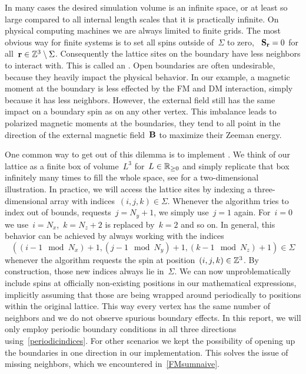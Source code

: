 In many cases the desired simulation volume is an infinite space, or at least so
large compared to all internal length scales that it is practically infinite. On
physical computing machines we are always limited to finite grids. The most
obvious way for finite systems is to set all spins outside of~$\Sigma$ to zero,
\ie{}~$\mathbf{S}_{\mathbf{r}} = 0$ for all~$\mathbf{r} \in \mathbb{Z}^3 \setminus \Sigma$. Consequently the
lattice sites on the boundary have less neighbors to interact with. This is
called an . Open boundaries are often undesirable,
because they heavily impact the physical behavior. In our example, a magnetic
moment at the boundary is less effected by the FM and DM interaction, simply
because it has less neighbors. However, the external field still has the same
impact on a boundary spin as on any other vertex. This imbalance leads to
polarized magnetic moments at the boundaries, \ie{} they tend to all point in
the direction of the external magnetic field~$\mathbf{B}$ to maximize their Zeeman
energy.

One common way to get out of this dilemma is to implement . We think of our lattice as a finite box of volume~$L^3$
for~$L\in \mathbb{R}_{\ge 0}$ and simply replicate that box infinitely many times to fill the
whole space, see  for a two-dimensional illustration. In
practice, we will access the lattice sites by indexing a three-dimensional array
with indices~$(i,j,k)\in\Sigma$. Whenever the algorithm tries to index out of
bounds, \eg{} requests~$j=N_y + 1$, we simply use~$j=1$ again. For~$i=0$ we
use~$i=N_x$,~$k=N_z+2$ is replaced by~$k=2$ and so on. In general, this behavior
can be achieved by always working with the indices
%
\begin{equation}\label{periodicindices}
  ((i-1 \mod N_x) + 1, (j-1 \mod N_y) + 1, (k-1 \mod N_z) + 1) \in \Sigma
\end{equation}
%
whenever the algorithm requests the spin at position~$(i,j,k) \in \mathbb{Z}^3$. By
construction, those new indices always lie in~$\Sigma$. We can now
unproblematically include spins at officially non-existing positions in our
mathematical expressions, implicitly assuming that those are being wrapped
around periodically to positions within the original lattice. This way every
vertex has the same number of neighbors and we do not observe spurious boundary
effects. In this report, we will only employ periodic boundary conditions in all
three directions using~\eqref{periodicindices}. For other scenarios we kept the
possibility of opening up the boundaries in one direction in our implementation.
This solves the issue of missing neighbors, which we encountered
in~\eqref{FMsumnaive}.

